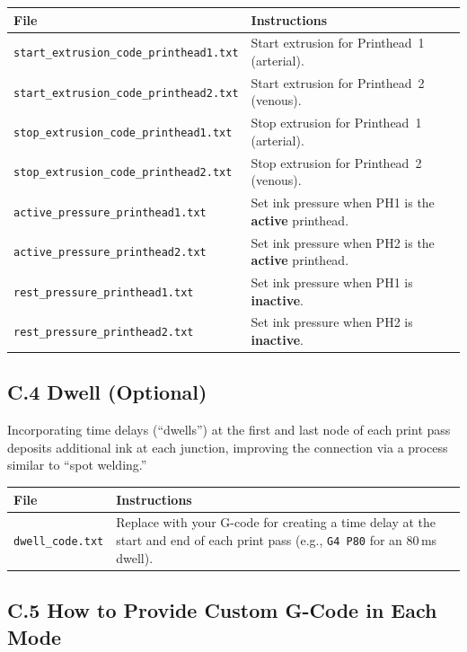 \documentclass[11pt,letterpaper]{article}
\newcommand{\code}[1]{\texttt{#1}}
\begin{document}
{\footnotesize
\begin{longtable}{@{}L{5.8cm}p{7.8cm}@{}}
\toprule
\textbf{File} & \textbf{Instructions} \\
\midrule
\code{start\_extrusion\_code\_printhead1.txt} & Start extrusion for Printhead~1 (arterial). \\
\code{start\_extrusion\_code\_printhead2.txt} & Start extrusion for Printhead~2 (venous). \\
\code{stop\_extrusion\_code\_printhead1.txt} & Stop extrusion for Printhead~1 (arterial). \\
\code{stop\_extrusion\_code\_printhead2.txt} & Stop extrusion for Printhead~2 (venous). \\
\code{active\_pressure\_printhead1.txt} & Set ink pressure when PH1 is the \textbf{active} printhead. \\
\code{active\_pressure\_printhead2.txt} & Set ink pressure when PH2 is the \textbf{active} printhead. \\
\code{rest\_pressure\_printhead1.txt} & Set ink pressure when PH1 is \textbf{inactive}. \\
\code{rest\_pressure\_printhead2.txt} & Set ink pressure when PH2 is \textbf{inactive}. \\
\bottomrule
\end{longtable}
}%

\subsection{C.4 Dwell (Optional)}

Incorporating time delays (``dwells'') at the first and last node of each print pass deposits additional ink at each junction, improving the connection via a process similar to ``spot welding.''

\begin{longtable}{@{}p{3cm}p{11cm}@{}}
\toprule
\textbf{File} & \textbf{Instructions} \\
\midrule
\code{dwell\_code.txt} & Replace with your G-code for creating a time delay at the start and end of each print pass (e.g., \code{G4 P80} for an 80\,ms dwell). \\
\bottomrule
\end{longtable}

\subsection{C.5 How to Provide Custom G-Code in Each Mode}
\end{document}
